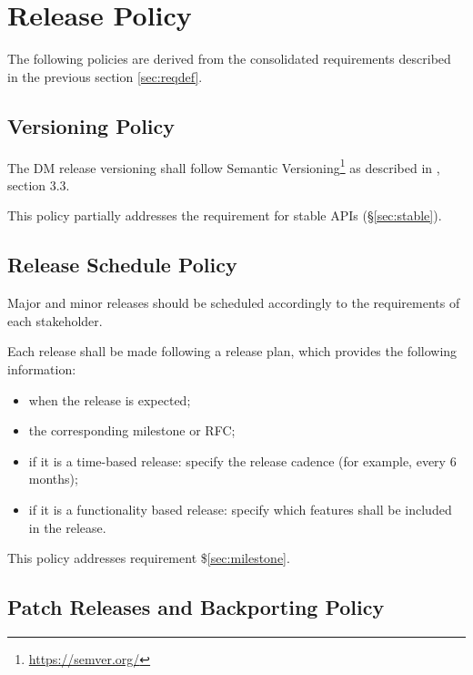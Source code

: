 \section{Release Policy} \label{sec:policy}

The following policies are derived from the consolidated requirements described in the previous section \ref{sec:reqdef}.


\subsection{Versioning Policy} \label{sec:versinopolicy}

The DM release versioning shall follow Semantic Versioning\footnote{\url{https://semver.org/}} as described in , section 3.3.

This policy partially addresses the requirement for stable APIs (\S\ref{sec:stable}).



\subsection{Release Schedule Policy} \label{sec:schedulepolicy}

Major and minor releases should be scheduled accordingly to the requirements of each stakeholder.

Each release shall be made following a release plan, which provides the following information:

\begin{itemize}
\item when the release is expected;
\item the corresponding milestone or RFC;
\item if it is a time-based release: specify the release cadence (for example, every 6 months);
\item if it is a functionality based release: specify which features shall be included in the release.
\end{itemize}

This policy addresses requirement \$\ref{sec:milestone}.


\subsection{Patch Releases and Backporting Policy} \label{sec:patchpolicy}

